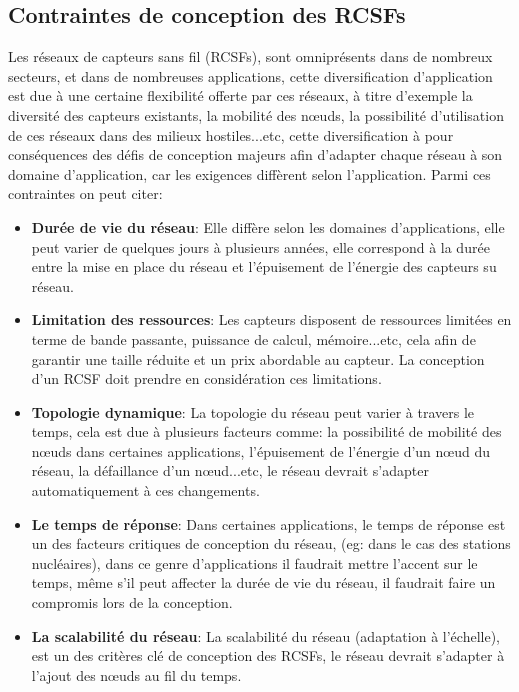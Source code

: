 \subsection{Contraintes de conception des RCSFs }
Les réseaux de capteurs sans fil (RCSFs), sont omniprésents dans de nombreux secteurs, et dans de nombreuses applications, cette diversification d'application est due  à une certaine flexibilité offerte par ces réseaux, à titre d'exemple la diversité des capteurs existants, la mobilité des nœuds, la possibilité d'utilisation de ces réseaux dans des milieux hostiles...etc, cette diversification à pour conséquences des défis de conception majeurs afin d'adapter chaque réseau à son domaine d'application, car les exigences diffèrent selon l'application.
Parmi ces contraintes on peut citer:

\begin{itemize}
\item \textbf{Durée de vie du réseau}: Elle diffère selon les domaines d'applications, elle peut varier de quelques jours à plusieurs années, elle correspond à la durée entre la mise en place du réseau et l'épuisement de l'énergie des capteurs su réseau.\\

\item \textbf{Limitation des ressources}: Les capteurs disposent de ressources limitées en terme de bande passante, puissance de calcul, mémoire...etc, cela afin de garantir une taille réduite et un prix abordable au capteur. La conception d'un RCSF doit prendre en considération ces limitations.\\

\item \textbf{Topologie dynamique}: La topologie du réseau peut varier à travers le temps, cela est due à plusieurs facteurs comme: la possibilité de mobilité des nœuds dans certaines applications, l'épuisement de l'énergie d'un nœud du réseau, la défaillance d'un nœud...etc, le réseau devrait s'adapter automatiquement à ces changements.\\

\item \textbf{Le temps de réponse}: Dans certaines applications, le temps de réponse est un des facteurs critiques de conception du réseau, (eg: dans le cas des stations nucléaires), dans ce genre d'applications il faudrait mettre l'accent sur le temps, même s'il peut affecter la durée de vie du réseau, il faudrait faire un compromis lors de la conception.\\

\item \textbf{La scalabilité du réseau}: La scalabilité  du réseau (adaptation à l'échelle), est un des critères clé de conception des RCSFs, le réseau devrait s'adapter à l'ajout des nœuds au fil du temps.\\


 

\end{itemize}




